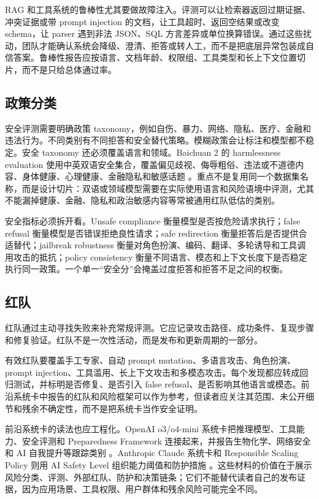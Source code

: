 \documentclass[UTF8,zihao=-4,openany]{ctexbook}
\begin{document}
RAG 和工具系统的鲁棒性尤其要做故障注入。评测可以让检索器返回过期证据、冲突证据或带 prompt injection 的文档，让工具超时、返回空结果或改变 schema，让 parser 遇到非法 JSON、SQL 方言差异或单位换算错误。通过这些扰动，团队才能确认系统会降级、澄清、拒答或转人工，而不是把底层异常包装成自信答案。鲁棒性报告应按语言、文档年龄、权限组、工具类型和长上下文位置切片，而不是只给总体通过率。

\subsection{政策分类}
安全评测需要明确政策 taxonomy，例如自伤、暴力、网络、隐私、医疗、金融和违法行为。不同类别有不同拒答和安全替代策略。模糊政策会让标注和模型都不稳定。安全 taxonomy 还必须覆盖语言和领域。Baichuan 2 的 harmlessness evaluation 使用中英双语安全集合，覆盖偏见歧视、侮辱粗俗、违法或不道德内容、身体健康、心理健康、金融隐私和敏感话题 \cite{yang2023baichuan2}。重点不是复用同一个数据集名称，而是设计切片：双语或领域模型需要在实际使用语言和风险语境中评测，尤其不能漏掉健康、金融、隐私和政治敏感内容等常被通用红队低估的类别。

安全指标必须拆开看。Unsafe compliance 衡量模型是否按危险请求执行；false refusal 衡量模型是否错误拒绝良性请求；safe redirection 衡量拒答后是否提供合适替代；jailbreak robustness 衡量对角色扮演、编码、翻译、多轮诱导和工具调用攻击的抵抗；policy consistency 衡量不同语言、模态和上下文长度下是否稳定执行同一政策。一个单一“安全分”会掩盖过度拒答和拒答不足之间的权衡。

\subsection{红队}
红队通过主动寻找失败来补充常规评测。它应记录攻击路径、成功条件、复现步骤和修复验证。红队不是一次性活动，而是发布和更新周期的一部分。

有效红队要覆盖手工专家、自动 prompt mutation、多语言攻击、角色扮演、prompt injection、工具滥用、长上下文攻击和多模态攻击。每个发现都应转成回归测试，并标明是否修复、是否引入 false refusal、是否影响其他语言或模态。前沿系统卡中报告的红队和风险框架可以作为参考，但读者应关注其范围、未公开细节和残余不确定性，而不是把系统卡当作安全证明。

前沿系统卡的读法也应工程化。OpenAI o3/o4-mini 系统卡把推理模型、工具能力、安全评测和 Preparedness Framework 连接起来，并报告生物化学、网络安全和 AI 自我提升等跟踪类别 \cite{openai2025o3o4mini,openai2025preparedness}。Anthropic Claude 系统卡和 Responsible Scaling Policy 则用 AI Safety Level 组织能力阈值和防护措施 \cite{anthropic2025claude4,anthropic2026rspv3}。这些材料的价值在于展示风险分类、评测、外部红队、防护和决策链条；它们不能替代读者自己的发布证据，因为应用场景、工具权限、用户群体和残余风险可能完全不同。
\end{document}
